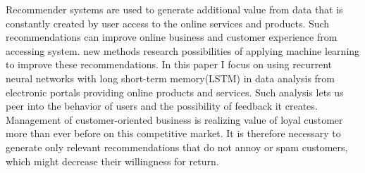 Recommender systems are used to generate additional value from data that is constantly created by user access to the online services and products. Such recommendations can improve online business and customer experience from accessing system. new methods research possibilities of applying machine learning to improve these recommendations.
In this paper I focus on using recurrent neural networks with long short-term memory(LSTM) in data analysis from electronic portals providing online products and services. Such analysis lets us peer into the behavior of users and the possibility of feedback it creates. Management of customer-oriented business is realizing value of loyal customer more than ever before on this competitive market. It is therefore necessary to generate only relevant recommendations that do not annoy or spam customers, which might decrease their willingness for return.
